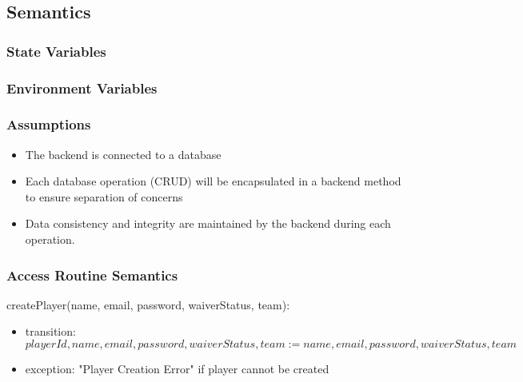 \documentclass[12pt, titlepage]{article}
\begin{document}
\subsection{Semantics}

\subsubsection{State Variables}


\subsubsection{Environment Variables}


\subsubsection{Assumptions}

\begin{itemize}
  \item The backend is connected to a database
  \item Each database operation (CRUD) will be encapsulated in a backend method to ensure separation of concerns
  \item Data consistency and integrity are maintained by the backend during each operation.

\end{itemize}

\subsubsection{Access Routine Semantics}

\noindent createPlayer(name, email, password, waiverStatus, team):
\begin{itemize}
  \item transition: $playerId, name, email, password, waiverStatus, team := name, email, password, waiverStatus, team$
  \item exception: "Player Creation Error" if player cannot be created
\end{itemize}
\end{document}
